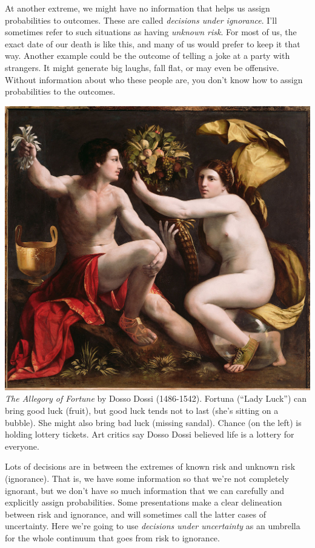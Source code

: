 \documentclass[]{tufte-book}
\begin{document}
At another extreme, we might have no information that helps us assign probabilities to outcomes. These are called \emph{decisions under ignorance}. I'll sometimes refer to such situations as having \emph{unknown risk}. For most of us, the exact date of our death is like this, and many of us would prefer to keep it that way. Another example could be the outcome of telling a joke at a party with strangers. It might generate big laughs, fall flat, or may even be offensive. Without information about who these people are, you don't know how to assign probabilities to the outcomes.

\begin{marginfigure}
\includegraphics{img/Dosso_Dossi.png} \emph{The Allegory of Fortune} by
Dosso Dossi (1486-1542). Fortuna (``Lady Luck'') can bring good luck
(fruit), but good luck tends not to last (she's sitting on a bubble).
She might also bring bad luck (missing sandal). Chance (on the left) is
holding lottery tickets. Art critics say Dosso Dossi believed life is a
lottery for everyone.
\end{marginfigure}

Lots of decisions are in between the extremes of known risk and unknown risk (ignorance). That is, we have some information so that we're not completely ignorant, but we don't have so much information that we can carefully and explicitly assign probabilities. Some presentations make a clear delineation between risk and ignorance, and will sometimes call the latter cases of uncertainty. Here we're going to use \emph{decisions under uncertainty} as an umbrella for the whole continuum that goes from risk to ignorance.
\end{document}
